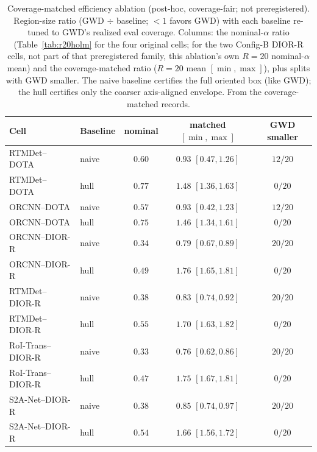 \documentclass[journal]{IEEEtran}
\begin{document}
\begin{table}[!t]\centering\small
\caption{Coverage-matched efficiency ablation (post-hoc, coverage-fair; not preregistered).
Region-size ratio (GWD $\div$ baseline; ${<}1$ favors GWD) with each baseline re-tuned to GWD's realized
eval coverage. Columns: the nominal-$\alpha$ ratio (Table~\ref{tab:r20holm} for the four original cells; for
the two Config-B DIOR-R cells, not part of that preregistered family, this ablation's own $R{=}20$
nominal-$\alpha$ mean) and the coverage-matched ratio
($R{=}20$ mean $[\min,\max]$), plus splits with GWD smaller. The naive baseline certifies the full oriented
box (like GWD); the hull certifies only the coarser axis-aligned envelope. From the coverage-matched
records.}
\label{tab:covmatched}
\begin{tabular}{llccc}
\toprule
Cell & Baseline & nominal & matched $[\min,\max]$ & GWD smaller \\
\midrule
RTMDet--DOTA   & naive & $0.60$ & $0.93$ $[0.47,1.26]$ & $12/20$ \\
RTMDet--DOTA   & hull  & $0.77$ & $1.48$ $[1.36,1.63]$ & $0/20$ \\
ORCNN--DOTA    & naive & $0.57$ & $0.93$ $[0.42,1.23]$ & $12/20$ \\
ORCNN--DOTA    & hull  & $0.75$ & $1.46$ $[1.34,1.61]$ & $0/20$ \\
ORCNN--DIOR-R  & naive & $0.34$ & $0.79$ $[0.67,0.89]$ & $20/20$ \\
ORCNN--DIOR-R  & hull  & $0.49$ & $1.76$ $[1.65,1.81]$ & $0/20$ \\
RTMDet--DIOR-R & naive & $0.38$ & $0.83$ $[0.74,0.92]$ & $20/20$ \\
RTMDet--DIOR-R & hull  & $0.55$ & $1.70$ $[1.63,1.82]$ & $0/20$ \\
RoI-Trans--DIOR-R & naive & $0.33$ & $0.76$ $[0.62,0.86]$ & $20/20$ \\
RoI-Trans--DIOR-R & hull  & $0.47$ & $1.75$ $[1.67,1.81]$ & $0/20$ \\
S2A-Net--DIOR-R   & naive & $0.38$ & $0.85$ $[0.74,0.97]$ & $20/20$ \\
S2A-Net--DIOR-R   & hull  & $0.54$ & $1.66$ $[1.56,1.72]$ & $0/20$ \\
\bottomrule
\end{tabular}
\end{table}
\end{document}
